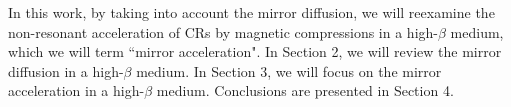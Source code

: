 \documentclass[preprint2,twocolumn,times,tighten]{aastex63}
\begin{document}
In this work, by taking into account the mirror diffusion, we will reexamine the non-resonant acceleration of CRs by magnetic compressions in a high-$\beta$ medium, which we will term ``mirror acceleration".
In Section 2, we will review the mirror diffusion in a high-$\beta$ medium.
In Section 3, we will focus on the mirror acceleration in a high-$\beta$ medium. 
Conclusions are presented in Section 4. 

\end{document}
